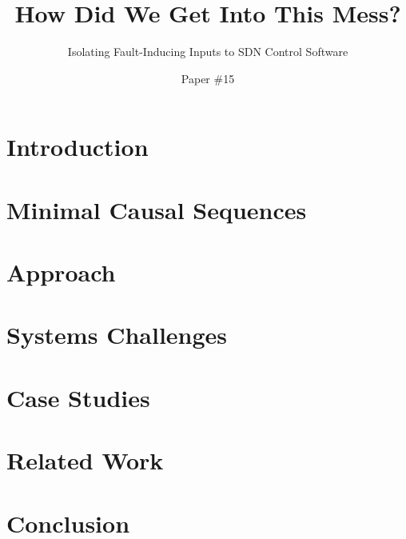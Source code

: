 \documentclass{sig-alt-hotnets}
\begin{document}
    \date{}

\title{How Did We Get Into This Mess?}
\subtitle{Isolating Fault-Inducing Inputs to SDN Control Software}

\author{Paper \#15}

\date{}
    \maketitle
    \thispagestyle{empty}

\abstract{{\it }}

\section{Introduction}
\label{sec:intro}


\section{Minimal Causal Sequences}
\label{sec:formalism}


\section{Approach}
\label{sec:approach}


\section{Systems Challenges}
\label{sec:systems_challenges}


\section{Case Studies}
\label{sec:casestudies}


%

\section{Related Work}
\label{sec:related_work}


\section{Conclusion}
\label{sec:conclusion}


 \small 

%
\end{document}

